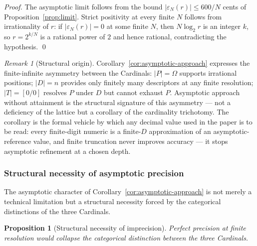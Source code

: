 \documentclass[11pt,a4paper]{article}
\newtheorem{proposition}[theorem]{Proposition}
\theoremstyle{definition}
\theoremstyle{remark}
\newtheorem{remark}[theorem]{Remark}
\begin{document}
\begin{proof}
The asymptotic limit follows from the bound $|\varepsilon_{N}(r)| \le 600/N$ cents of Proposition~\ref{prop:limit}. Strict positivity at every finite $N$ follows from irrationality of $r$: if $|\varepsilon_{N}(r)| = 0$ at some finite $N$, then $N \log_{2} r$ is an integer $k$, so $r = 2^{k/N}$ is a rational power of $2$ and hence rational, contradicting the hypothesis. \qed
\end{proof}

\begin{remark}[Structural origin]\label{rem:asymptotic-origin}
Corollary~\ref{cor:asymptotic-approach} expresses the finite-infinite asymmetry between the Cardinals: $|P| = \Omega$ supports irrational positions; $|D| = n$ provides only finitely many descriptors at any finite resolution; $|T|=[0/0]$ resolves $P$ under $D$ but cannot exhaust $P$. Asymptotic approach without attainment is the structural signature of this asymmetry --- not a deficiency of the lattice but a corollary of the cardinality trichotomy. The corollary is the formal vehicle by which any decimal value used in the paper is to be read: every finite-digit numeric is a finite-$D$ approximation of an asymptotic-reference value, and finite truncation never improves accuracy --- it stops asymptotic refinement at a chosen depth.
\end{remark}

\subsubsection{Structural necessity of asymptotic precision}\label{subsubsec:precision-necessity}

The asymptotic character of Corollary~\ref{cor:asymptotic-approach} is not merely a technical limitation but a structural necessity forced by the categorical distinctions of the three Cardinals.

\begin{proposition}[Structural necessity of imprecision]\label{prop:precision-necessary}
Perfect precision at finite resolution would collapse the categorical distinction between the three Cardinals.
\end{proposition}
\end{document}
